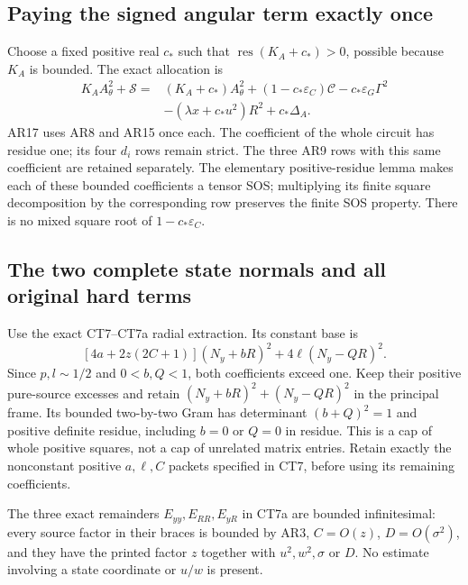 \subsection{Paying the signed angular term exactly once}

Choose a fixed positive real $c_*$ such that
$\operatorname{res}(K_A+c_*)>0$, possible because $K_A$ is
bounded. The exact allocation is
\[
\begin{split}
 K_AA_\theta^2+\mathscr S
  ={}&(K_A+c_*)A_\theta^2
       +(1-c_*\varepsilon_C)\mathscr C
       -c_*\varepsilon_G\Gamma^2\\
    &-(\lambda x+c_*u^2)R^2+c_*\Delta_A.
\end{split} \tag{AR17}
\]
AR17 uses AR8 and AR15 once each. The coefficient of the whole
circuit has residue one; its four $d_i$ rows remain strict.
The three AR9 rows with this same coefficient are retained
separately. The elementary positive-residue lemma makes each
of these bounded coefficients a tensor SOS; multiplying its
finite square decomposition by the corresponding row preserves
the finite SOS property. There is no mixed square root of
$1-c_*\varepsilon_C$.

\subsection{The two complete state normals and all original hard terms}

Use the exact CT7--CT7a radial extraction. Its constant base is
\[
 [4a+2z(2C+1)](N_y+bR)^2+4\ell(N_y-QR)^2.
 \tag{AR18}
\]
Since $p,l\sim1/2$ and $0<b,Q<1$, both coefficients exceed
one. Keep their positive pure-source excesses and retain
$(N_y+bR)^2+(N_y-QR)^2$ in the principal frame. Its bounded
two-by-two Gram has determinant $(b+Q)^2=1$ and positive
definite residue, including $b=0$ or $Q=0$ in residue. This is
a cap of whole positive squares, not a cap of unrelated matrix
entries. Retain exactly the nonconstant positive $a,\ell,C$
packets specified in CT7, before using its remaining coefficients.

The three exact remainders $E_{yy},E_{RR},E_{yR}$ in CT7a are
bounded infinitesimal: every source factor in their braces is
bounded by AR3, $C=O(z)$, $D=O(\sigma^2)$, and they have the
printed factor $z$ together with $u^2,w^2,\sigma$ or $D$.
No estimate involving a state coordinate or $u/w$ is present.

